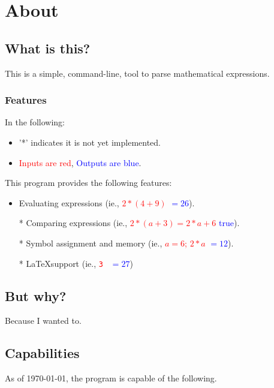 \chapter{About}
    \section{What is this?}
        This is a simple, command-line, tool to parse mathematical expressions. 

        \subsection*{Features}
            In the following:
            \begin{itemize}
                \item '*' indicates it is not yet implemented.
                \item \textcolor{red}{Inputs are red}, \textcolor{blue}{Outputs are blue}.
            \end{itemize}

            \noindent This program provides the following features:
            \begin{itemize}
                \item Evaluating expressions (ie., \textcolor{red}{$2 * (4 + 9)$} \textcolor{blue}{$= 26$}).
                \item[*] Comparing expressions (ie., \textcolor{red}{$2 * (a + 3) = 2 * a + 6$} \textcolor{blue}{true}).
                \item[*] Symbol assignment and memory (ie., \textcolor{red}{$a = 6$; $2 * a$} \textcolor{blue}{$= 12$}).
                \item[*] \LaTeX support (ie., \textcolor{red}{\texttt{3 }} \textcolor{blue}{$= 27$}) 
            \end{itemize}

    \section{But why?}
        Because I wanted to.

    \section{Capabilities}
        As of \today{}, the program is capable of the following.

